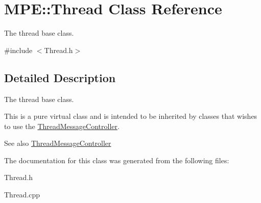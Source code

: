 \hypertarget{class_m_p_e_1_1_thread}{}\section{M\+PE\+:\+:Thread Class Reference}
\label{class_m_p_e_1_1_thread}


The thread base class.  




{\ttfamily \#include $<$Thread.\+h$>$}



\subsection{Detailed Description}
The thread base class. 

This is a pure virtual class and is intended to be inherited by classes that wishes to use the \hyperlink{class_m_p_e_1_1_thread_message_controller}{Thread\+Message\+Controller}. \begin{DoxySeeAlso}{See also}
\hyperlink{class_m_p_e_1_1_thread_message_controller}{Thread\+Message\+Controller} 
\end{DoxySeeAlso}


The documentation for this class was generated from the following files\+:\begin{DoxyCompactItemize}
\item 
Thread.\+h\item 
Thread.\+cpp\end{DoxyCompactItemize}
